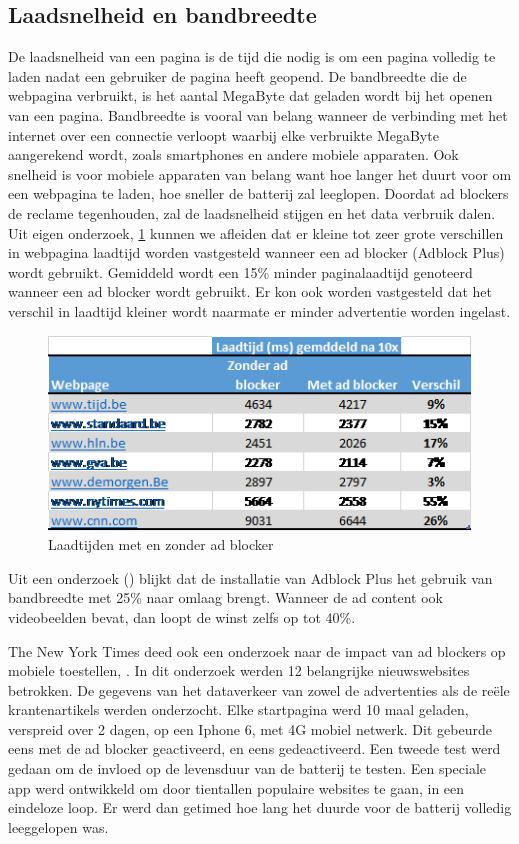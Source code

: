 \documentclass[pdftex,a4paper,12pt,twoside]{report}
\begin{document}
\subsection{Laadsnelheid en bandbreedte}
\label{sec Laadsnelheid en bandbreedte}
De laadsnelheid van een pagina is de tijd die nodig is om een pagina volledig te laden nadat een gebruiker de pagina heeft geopend. De bandbreedte die de webpagina verbruikt, is het aantal MegaByte dat geladen wordt bij het openen van een pagina. Bandbreedte is vooral van belang wanneer de verbinding met het internet over een connectie verloopt waarbij elke verbruikte MegaByte aangerekend wordt, zoals smartphones en andere mobiele apparaten. Ook snelheid is voor mobiele apparaten van belang want hoe langer het duurt voor om een webpagina te laden, hoe sneller de batterij zal leeglopen. Doordat ad blockers de reclame tegenhouden, zal de laadsnelheid stijgen en het data verbruik dalen.
\\

Uit eigen onderzoek, \ref{fig: LoadTimes} kunnen we afleiden dat er kleine tot zeer grote verschillen in webpagina laadtijd worden vastgesteld wanneer een ad blocker (Adblock Plus) wordt gebruikt. Gemiddeld wordt een 15\% minder paginalaadtijd genoteerd wanneer een ad blocker wordt gebruikt. Er kon ook worden vastgesteld dat het verschil in laadtijd kleiner wordt naarmate er minder advertentie worden ingelast.

\begin{figure}[h!]
\centering
\includegraphics[width=12cm]{img/Eigenonderzoek}
\caption{Laadtijden met en zonder ad blocker}
\label{fig: LoadTimes}
\end{figure}

Uit een onderzoek (\cite{Fraser2015}) blijkt dat de installatie van Adblock Plus het gebruik van bandbreedte met 25\% naar omlaag brengt. Wanneer de ad content ook videobeelden bevat, dan loopt de winst zelfs op tot 40\%. 

The New York Times deed ook een onderzoek naar de impact van ad blockers op mobiele toestellen, \cite{nytimes2015}.
In dit onderzoek werden 12 belangrijke nieuwswebsites betrokken. De gegevens van het dataverkeer van zowel de advertenties als de reële krantenartikels werden onderzocht. Elke startpagina werd 10 maal geladen, verspreid over 2 dagen, op een Iphone 6, met 4G mobiel netwerk. Dit gebeurde eens met de ad blocker geactiveerd, en eens gedeactiveerd. Een tweede test werd gedaan om de invloed op de levensduur van de batterij te testen. Een speciale app werd ontwikkeld om door tientallen populaire websites te gaan, in een eindeloze loop. Er werd dan getimed hoe lang het duurde voor de batterij volledig leeggelopen was.
\end{document}

